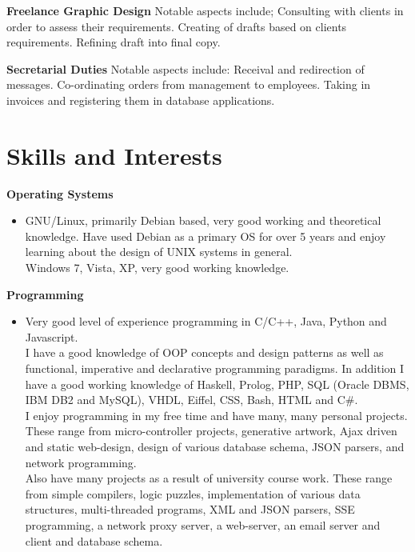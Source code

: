 \documentclass{res}
\begin{document}
\begin{resume}
    {\bf Freelance Graphic Design} Notable aspects include; Consulting with clients in order to assess their requirements. Creating of drafts based on clients requirements. Refining draft into final copy.
 
    {\bf Secretarial Duties} Notable aspects include: Receival and redirection of messages. Co-ordinating orders from management to employees. Taking in invoices and registering them in database applications.

 
   
 


     
\section{Skills and Interests} 
\vspace{0.1in}
 {\bf Operating Systems}
    \begin{itemize} %
      \item[] GNU/Linux, primarily Debian based, very good working and theoretical knowledge. Have used Debian as a primary OS for over 5 years and enjoy learning about the design of UNIX systems in general.\\
        Windows 7, Vista, XP, very good working knowledge.
      \end{itemize}
{\bf Programming} 
       \begin{itemize}
        \item[] Very good level of experience programming in C/C++, Java, Python and Javascript.\\
        I have a good knowledge of OOP concepts and design patterns as well as functional, imperative and declarative programming paradigms.  
        In addition I have a good working knowledge of Haskell, Prolog, PHP, SQL (Oracle DBMS, IBM DB2 and MySQL), VHDL, Eiffel, CSS, Bash, HTML and C\#.\\
        I enjoy programming in my free time and have many, many personal projects. These range from micro-controller projects, generative artwork, Ajax driven and static web-design, design of various database schema, JSON parsers, and network programming.\\
        Also have many projects as a result of university course work. These range from simple compilers, logic puzzles, implementation of various data structures, multi-threaded programs, XML and JSON parsers, SSE programming, a network proxy server, a web-server, an email server and client and database schema.
    \end{itemize}


\end{resume}
\end{document}
